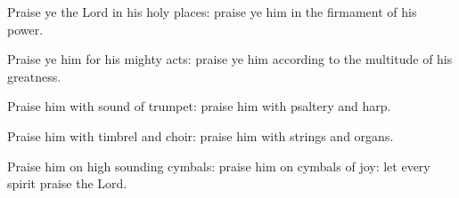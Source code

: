 \item Praise ye the Lord in his holy places: praise ye him in the firmament of his power.
\item Praise ye him for his mighty acts: praise ye him according to the multitude of his greatness.
\item Praise him with sound of trumpet: praise him with psaltery and harp.
\item Praise him with timbrel and choir: praise him with strings and organs.
\item Praise him on high sounding cymbals: praise him on cymbals of joy: let every spirit praise the Lord.
